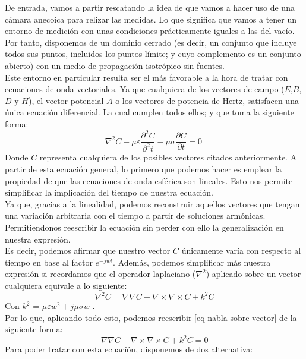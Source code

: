 \documentclass{article}
\begin{document}
De entrada, vamos a partir rescatando la idea de que vamos a hacer uso  de una cámara anecoica para relizar las medidas. Lo que significa que vamos a tener un entorno de medición con unas condiciones prácticamente iguales a las del vacío. \\
Por tanto, disponemos de un dominio cerrado (es decir,  un conjunto que incluye todos sus puntos, incluidos los puntos límite; y cuyo complemento es un conjunto abierto) con un medio de propagación isotrópico sin fuentes.\\

Este entorno en particular resulta ser el más favorable a la hora de tratar con ecuaciones de onda vectoriales. Ya que cualquiera de los vectores de campo ($E$,$B$,$D$ y $H$),  el vector potencial $A$ o  los vectores de potencia de Hertz, satisfacen una única ecuación diferencial. La cual cumplen todos ellos; y que toma la siguiente forma:
\begin{equation}
\nabla^2C - \mu\varepsilon\frac{\partial^2C}{\partial^2{t}} - \mu\sigma\frac{\partial C}{\partial{t}} = 0\
\label{eq-esfvec-general}
\end{equation}
Donde $C$ representa cualquiera de los posibles vectores citados anteriormente.\newpage
A partir de esta ecuación general, lo primero que podemos hacer es emplear la propiedad de que las ecuaciones de onda esférica son lineales. Esto nos permite simplificar la implicación del tiempo de nuestra ecuación.\\
Ya que, gracias a la linealidad, podemos reconstruir aquellos vectores que tengan una variación arbitraria con el tiempo a partir de soluciones armónicas. Permitiendonos reescribir la ecuación sin perder con ello la generalización en nuestra expresión. \\

Es decir, podemos afirmar que nuestro vector  $C$ únicamente varía con respecto al tiempo en base al factor $e^{-jwt}$. 
Además, podemos simplificar más nuestra expresión si recordamos que el operador laplaciano ($\nabla^2$) aplicado sobre un vector cualquiera equivale a lo siguiente:
\begin{equation}
\nabla^2C =\nabla\nabla C - \nabla\times\nabla\times C + k^2C
\label{eq-nabla-sobre-vector}
\end{equation}
Con $k^2$ = $\mu\varepsilon w^2 + j\mu\sigma w$ .\\

Por lo que, aplicando todo esto, podemos reescribir  \eqref{eq-nabla-sobre-vector} de la siguiente forma:
\begin{equation}
\nabla\nabla C - \nabla \times \nabla \times C + k^2 C = 0\label{eq-esfvec-simplificada}
\end{equation}
Para poder tratar con esta ecuacíón, disponemos de dos alternativa: 
\end{document}
